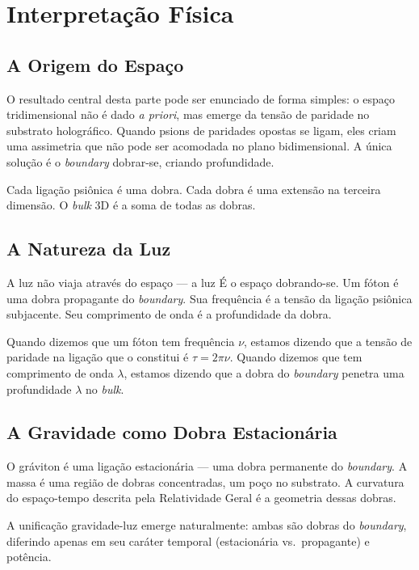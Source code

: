 \documentclass[12pt,a4paper,twoside]{article}
\newcommand{\boundary}{\textit{boundary}}
\newcommand{\bulk}{\textit{bulk}}
\begin{document}
\section{Interpreta\c{c}\~ao F\'isica}


\subsection{A Origem do Espa\c{c}o}

O resultado central desta parte pode ser enunciado de forma simples: o espa\c{c}o tridimensional n\~ao \'e dado \textit{a priori}, mas emerge da tens\~ao de paridade no substrato hologr\'afico. Quando psions de paridades opostas se ligam, eles criam uma assimetria que n\~ao pode ser acomodada no plano bidimensional. A \'unica solu\c{c}\~ao \'e o \boundary{} dobrar-se, criando profundidade.

Cada liga\c{c}\~ao psi\^onica \'e uma dobra. Cada dobra \'e uma extens\~ao na terceira dimens\~ao. O \bulk{} 3D \'e a soma de todas as dobras.

\subsection{A Natureza da Luz}

A luz n\~ao viaja atrav\'es do espa\c{c}o --- a luz \'E o espa\c{c}o dobrando-se. Um f\'oton \'e uma dobra propagante do \boundary. Sua frequ\^encia \'e a tens\~ao da liga\c{c}\~ao psi\^onica subjacente. Seu comprimento de onda \'e a profundidade da dobra.

Quando dizemos que um f\'oton tem frequ\^encia $\nu$, estamos dizendo que a tens\~ao de paridade na liga\c{c}\~ao que o constitui \'e $\tau = 2\pi\nu$. Quando dizemos que tem comprimento de onda $\lambda$, estamos dizendo que a dobra do \boundary{} penetra uma profundidade $\lambda$ no \bulk.

\subsection{A Gravidade como Dobra Estacion\'aria}

O gr\'aviton \'e uma liga\c{c}\~ao estacion\'aria --- uma dobra permanente do \boundary. A massa \'e uma regi\~ao de dobras concentradas, um po\c{c}o no substrato. A curvatura do espa\c{c}o-tempo descrita pela Relatividade Geral \'e a geometria dessas dobras.

A unifica\c{c}\~ao gravidade-luz emerge naturalmente: ambas s\~ao dobras do \boundary, diferindo apenas em seu car\'ater temporal (estacion\'aria vs.\ propagante) e pot\^encia.
\end{document}
